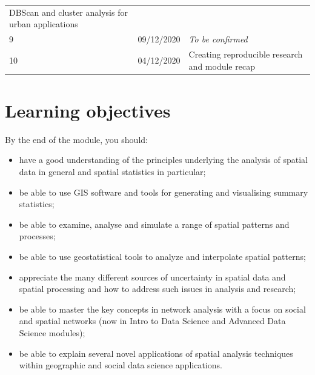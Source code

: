 \documentclass[
]{book}
\providecommand{\tightlist}{%
  \setlength{\itemsep}{0pt}\setlength{\parskip}{0pt}}
\begin{document}
\begin{longtable}[]{@{}lll@{}}
\begin{minipage}[t]{0.49\columnwidth}
DBScan and cluster analysis for urban applications\strut
\end{minipage}\tabularnewline
\begin{minipage}[t]{0.23\columnwidth}\raggedright
9\strut
\end{minipage} & \begin{minipage}[t]{0.20\columnwidth}\raggedright
09/12/2020\strut
\end{minipage} & \begin{minipage}[t]{0.49\columnwidth}\raggedright
\emph{To be confirmed }\strut
\end{minipage}\tabularnewline
\begin{minipage}[t]{0.23\columnwidth}\raggedright
10\strut
\end{minipage} & \begin{minipage}[t]{0.20\columnwidth}\raggedright
04/12/2020\strut
\end{minipage} & \begin{minipage}[t]{0.49\columnwidth}\raggedright
Creating reproducible research and module recap\strut
\end{minipage}\tabularnewline
\bottomrule
\end{longtable}

\hypertarget{learning-objectives}{%
\section*{Learning objectives}\label{learning-objectives}}

By the end of the module, you should:

\begin{itemize}
\tightlist
\item
  have a good understanding of the principles underlying the analysis of spatial data in general and spatial statistics in particular;
\item
  be able to use GIS software and tools for generating and visualising summary statistics;
\item
  be able to examine, analyse and simulate a range of spatial patterns and processes;
\item
  be able to use geostatistical tools to analyze and interpolate spatial patterns;
\item
  appreciate the many different sources of uncertainty in spatial data and spatial processing and how to address such issues in analysis and research;
\item
  be able to master the key concepts in network analysis with a focus on social and spatial networks (now in Intro to Data Science and Advanced Data Science modules);
\item
  be able to explain several novel applications of spatial analysis techniques within geographic and social data science applications.
\end{itemize}
\end{document}
